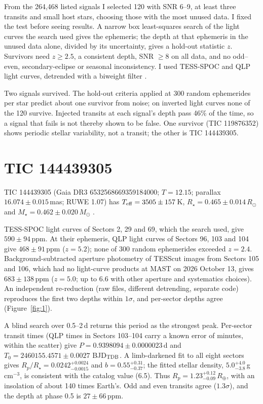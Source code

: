 \documentclass{aastex701}
\begin{document}
From the 264,468 listed signals I selected 120 with SNR 6--9, at least three transits and small host stars, choosing those with the most unused data. I fixed the test before seeing results. A narrow box least-squares search \citep{2002A&A...391..369K} of the light curves the search used gives the ephemeris; the depth at that ephemeris in the unused data alone, divided by its uncertainty, gives a hold-out statistic $z$. Survivors need $z\ge2.5$, a consistent depth, SNR $\ge8$ on all data, and no odd--even, secondary-eclipse or seasonal inconsistency. I used TESS-SPOC \citep{2020RNAAS...4..201C} and QLP \citep{2020RNAAS...4..204H} light curves, detrended with a biweight filter \citep{2019AJ....158..143H}.

Two signals survived. The hold-out criteria applied at 300 random ephemerides per star predict about one survivor from noise; on inverted light curves none of the 120 survive. Injected transits at each signal's depth pass 46\% of the time, so a signal that fails is not thereby shown to be false. One survivor (TIC 119876352) shows periodic stellar variability, not a transit; the other is TIC 144439305.

\section{TIC 144439305}

TIC 144439305 (Gaia DR3 6532568669359184000; $T=12.15$; parallax $16.074\pm0.015$\,mas; RUWE 1.07) has $T_{\rm eff}=3505\pm157$\,K, $R_\star=0.465\pm0.014\,R_\odot$ and $M_\star=0.462\pm0.020\,M_\odot$ \citep{2019AJ....158..138S,2016A&A...595A...1G,2023A&A...674A...1G}.

TESS-SPOC light curves of Sectors 2, 29 and 69, which the search used, give $590\pm94$\,ppm. At their ephemeris, QLP light curves of Sectors 96, 103 and 104 give $468\pm91$\,ppm ($z=5.2$); none of 300 random ephemerides exceeded $z=2.4$. Background-subtracted aperture photometry of TESScut \citep{2019ascl.soft05007B} images from Sectors 105 and 106, which had no light-curve products at MAST on 2026 October 13, gives $683\pm138$\,ppm ($z=5.0$; up to 6.6 with other aperture and systematics choices). An independent re-reduction (raw files, different detrending, separate code) reproduces the first two depths within $1\sigma$, and per-sector depths agree (Figure~\ref{fig:1}).

A blind search over 0.5--2\,d returns this period as the strongest peak. Per-sector transit times (QLP times in Sectors 103--104 carry a known error of minutes, within the scatter) give $P=0.9398094\pm0.0000023$\,d and $T_0=2460155.4571\pm0.0027$ BJD$_{\rm TDB}$. A limb-darkened fit to all eight sectors gives $R_p/R_\star=0.0242^{+0.0024}_{-0.0015}$ and $b=0.55^{+0.31}_{-0.37}$; the fitted stellar density, $5.0^{+4.0}_{-3.8}$\,g\,cm$^{-3}$, is consistent with the catalog value (6.5). Thus $R_p=1.23^{+0.12}_{-0.09}\,R_\oplus$, with an insolation of about 140 times Earth's. Odd and even transits agree ($1.3\sigma$), and the depth at phase 0.5 is $27\pm66$\,ppm.
\end{document}
